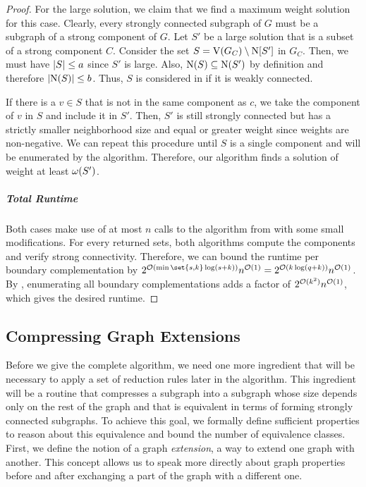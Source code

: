 \begin{theorem}
\begin{lemma}
\begin{theorem}
\begin{proof}
  For the large solution, we claim that we find a maximum weight solution for this case. Clearly, every strongly connected subgraph of $G$ must be a subgraph of a strong component of $G$. Let $S'$ be a large solution that is a subset of a strong component $C$. Consider the set $S = \operatorname{V}({G_C}) \setminus \operatorname{N}[{S'}]$ in $G_C$. Then, we must have $\abs{S} \le a$ since $S'$ is large. Also, $\operatorname{N}({S}) \subseteq \operatorname{N}({S'})$ by definition and therefore $\abs{\nei{S}} \le b$. Thus, $S$ is considered in  if it is weakly connected.

  If there is a $v \in S$ that is not in the same component as $c$, we take the component of $v$ in $S$ and include it in $S'$. Then, $S'$ is still strongly connected but has a strictly smaller neighborhood size and equal or greater weight since weights are non-negative. We can repeat this procedure until $S$ is a single component and will be enumerated by the algorithm. Therefore, our algorithm finds a solution of weight at least $\operatorname{\omega}({S'})$.

  \subparagraph*{Total Runtime} Both cases make use of at most $n$ calls to the algorithm from  with some small modifications. For every returned sets, both algorithms compute the components and verify strong connectivity. Therefore, we can bound the runtime per boundary complementation by $2^{\bigO{\min\set{s,k}\log(s+k)}}n^{\bigO{1}} = 2^{\bigO{k\log(q+k)}}n^{\bigO{1}}$. By , enumerating all boundary complementations adds a factor of $2^{\mathcal{O}(k^2)}n^{\mathcal{O}(1)}$, which gives the desired runtime.
\end{proof}
\fi

\subsection{Compressing Graph Extensions}\label{sec:scc_extensions}

Before we give the complete algorithm, we need one more ingredient that will be necessary to apply a set of reduction rules later in the algorithm. This ingredient will be a routine that compresses a subgraph into a subgraph whose size depends only on the rest of the graph and that is equivalent in terms of forming strongly connected subgraphs. To achieve this goal, we formally define sufficient properties to reason about this equivalence and bound the number of equivalence classes.
First, we define the notion of a graph \emph{extension}, a way to extend one graph with another. This concept allows us to speak more directly about graph properties before and after exchanging a part of the graph with a different one.


\end{theorem}
\end{lemma}
\end{theorem}

